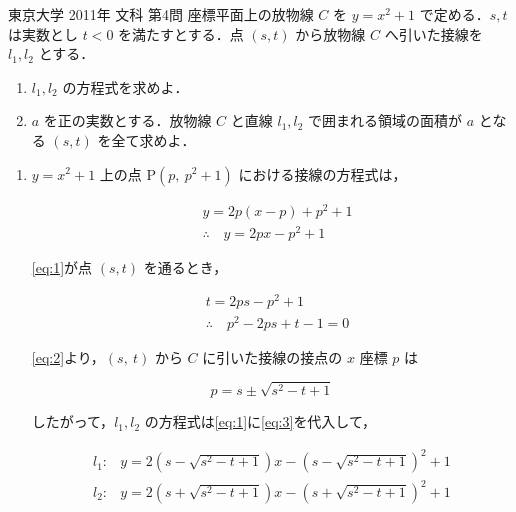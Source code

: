 \documentclass[a4paper]{ltjsarticle}
\begin{document}

\begin{itembox}[l]{東京大学 2011年 文科 第4問}
    座標平面上の放物線 $C$ を $y=x^2+1$ で定める．$s, t$ は実数とし $t<0$ を満たすとする．点 $(s, t)$ から放物線 $C$ へ引いた接線を $l_1, l_2$ とする．

    \begin{enumerate}[label=(\arabic*)]
        \item $l_1, l_2$ の方程式を求めよ．
        \item $a$ を正の実数とする．放物線 $C$ と直線 $l_1, l_2$ で囲まれる領域の面積が $a$ となる $(s, t)$ を全て求めよ．
    \end{enumerate}
\end{itembox}

\begin{enumerate}[label=(\arabic*)]
    \item
          $y=x^2+1$ 上の点 P$(p,\ p^2+1)$ における接線の方程式は，

          \begin{align}
               & y=2p(x-p)+p^2+1\nonumber                \\
               & \therefore\quad y=2px-p^2+1\label{eq:1}
          \end{align}

          \eqref{eq:1}が点 $(s, t)$ を通るとき，

          \begin{align}
               & t=2ps-p^2+1\nonumber                      \\
               & \therefore\quad p^2-2ps+t-1=0\label{eq:2}
          \end{align}

          \eqref{eq:2}より，$(s,\ t)$ から $C$ に引いた接線の接点の $x$ 座標 $p$ は

          \begin{equation}
              p=s\pm\sqrt{s^2-t+1}\label{eq:3}
          \end{equation}

          したがって，$l_1, l_2$ の方程式は\eqref{eq:1}に\eqref{eq:3}を代入して，

          \begin{align}
              l_1\colon & y=2(s-\sqrt{s^2-t+1})x-(s-\sqrt{s^2-t+1})^2+1\label{eq:4} \\
              l_2\colon & y=2(s+\sqrt{s^2-t+1})x-(s+\sqrt{s^2-t+1})^2+1\label{eq:5}
          \end{align}


\end{enumerate}
\end{document}
